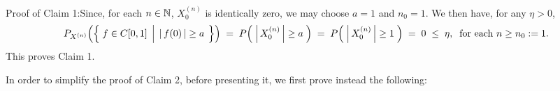 \vskip 0.5cm
\noindent
Proof of Claim 1:\quad Since, for each $n \in \mathbb{N}$, $X^{(n)}_{0}$ is identically zero, we may
choose $a = 1$ and $n_{0} = 1$. We then have, for any $\eta > 0$,
\begin{equation*}
	P_{X^{(n)}}\!\left(\left\{\;
		f \in \Czo
		\;\left\vert\;\,
		\vert\,f(0)\,\vert \overset{{\color{white}.}}{\geq} a
		\right.
	\;\right\}\right)
	\;=\;
	P\!\left(\; \left\vert\,X^{(n)}_{0}\,\right\vert \overset{{\color{white}.}}{\geq} a \;\right)
	\;=\;
	P\!\left(\; \left\vert\,X^{(n)}_{0}\,\right\vert \overset{{\color{white}.}}{\geq} 1 \;\right)
	\;=\; 0 \;\leq\; \eta,
	\;\;\textnormal{for each $n \geq n_{0} := 1$}.
\end{equation*}
This proves Claim 1.

\vskip 0.5cm
\noindent
In order to simplify the proof of Claim 2, before presenting it, we first prove instead the following:

